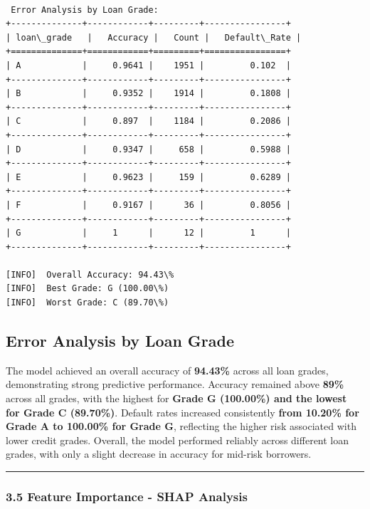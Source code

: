\documentclass[11pt]{article}
\begin{document}
    \begin{Verbatim}[commandchars=\\\{\}]

 Error Analysis by Loan Grade:
+--------------+------------+---------+----------------+
| loan\_grade   |   Accuracy |   Count |   Default\_Rate |
+==============+============+=========+================+
| A            |     0.9641 |    1951 |         0.102  |
+--------------+------------+---------+----------------+
| B            |     0.9352 |    1914 |         0.1808 |
+--------------+------------+---------+----------------+
| C            |     0.897  |    1184 |         0.2086 |
+--------------+------------+---------+----------------+
| D            |     0.9347 |     658 |         0.5988 |
+--------------+------------+---------+----------------+
| E            |     0.9623 |     159 |         0.6289 |
+--------------+------------+---------+----------------+
| F            |     0.9167 |      36 |         0.8056 |
+--------------+------------+---------+----------------+
| G            |     1      |      12 |         1      |
+--------------+------------+---------+----------------+

[INFO]  Overall Accuracy: 94.43\%
[INFO]  Best Grade: G (100.00\%)
[INFO]  Worst Grade: C (89.70\%)
    \end{Verbatim}

    \subsection{Error Analysis by Loan
Grade}\label{error-analysis-by-loan-grade}

The model achieved an overall accuracy of \textbf{94.43\%} across all
loan grades, demonstrating strong predictive performance. Accuracy
remained above \textbf{89\% }across all grades, with the highest for
\textbf{Grade G (100.00\%) and the lowest for Grade C (89.70\%)}.
Default rates increased consistently \textbf{from 10.20\% for Grade A to
100.00\% for Grade G}, reflecting the higher risk associated with lower
credit grades. Overall, the model performed reliably across different
loan grades, with only a slight decrease in accuracy for mid-risk
borrowers.

    \begin{center}\rule{0.5\linewidth}{0.5pt}\end{center}

\subsubsection{3.5 Feature Importance - SHAP
Analysis}\label{feature-importance---shap-analysis}
\end{document}

